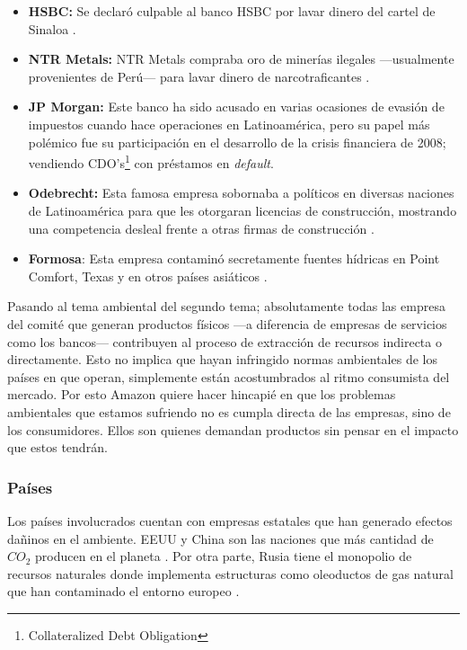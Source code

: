 \documentclass[11pt,a4paper]{article}
\begin{document}
\begin{itemize}
\item \textbf{HSBC:} Se declaró culpable al banco HSBC por lavar dinero del cartel de Sinaloa \cite{hsbc}.
\item \textbf{NTR Metals:} NTR Metals compraba oro de minerías ilegales —usualmente provenientes de Perú— para lavar dinero de narcotraficantes \cite{ntr}. 
\item \textbf{JP Morgan:} Este banco ha sido acusado en varias ocasiones de evasión de impuestos cuando hace operaciones en Latinoamérica, pero su papel más polémico fue su participación en el desarrollo de la crisis financiera de 2008; vendiendo CDO's\footnote{Collateralized Debt Obligation} con préstamos en \textit{default}.
\item \textbf{Odebrecht:} Esta famosa empresa sobornaba a políticos en diversas naciones de Latinoamérica para que les otorgaran licencias de construcción, mostrando una competencia desleal frente a otras firmas de construcción \cite{odb}.
\item \textbf{Formosa}: Esta empresa contaminó secretamente fuentes hídricas en Point Comfort, Texas y en otros países asiáticos \cite{for}.
\end{itemize}

\noindent Pasando al tema ambiental del segundo tema; absolutamente todas las empresa del comité que generan productos físicos —a diferencia de empresas de servicios como los bancos— contribuyen al proceso de extracción de recursos indirecta o directamente. Esto no implica que hayan infringido normas ambientales de los países en que operan, simplemente están acostumbrados al ritmo consumista del mercado. Por esto Amazon quiere hacer hincapié en que los problemas ambientales que estamos sufriendo no es cumpla directa de las empresas, sino de los consumidores. Ellos son quienes demandan productos sin pensar en el impacto que estos tendrán.

\subsubsection{Países}

\noindent Los países involucrados cuentan con empresas estatales que han generado efectos dañinos en el ambiente. EEUU y China son las naciones que más cantidad de $CO_{2}$ producen en el planeta \cite{co}. Por otra parte, Rusia tiene el monopolio de recursos naturales donde implementa estructuras como oleoductos de gas natural que han contaminado el entorno europeo \cite{gas}.
\end{document}
